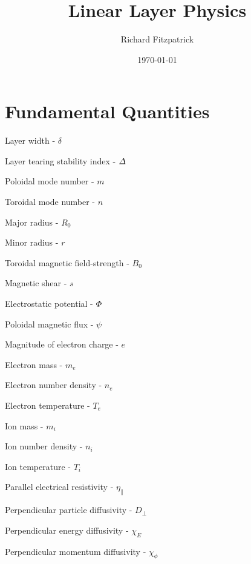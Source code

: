 \documentclass[notitlepage,12pt]{article}
\title{\bf Linear Layer Physics}
\date{\today}
\author{Richard Fitzpatrick}
\begin{document}
\maketitle

\section{Fundamental Quantities}
\begin{description}
\item Layer width - $\delta$
\item Layer tearing stability index - ${\mit\Delta}$
\item Poloidal mode number - $m$
\item Toroidal mode number - $n$
\item Major radius - $R_0$
\item Minor radius - $r$
\item Toroidal magnetic field-strength - $B_0$
\item Magnetic shear - $s$
\item Electrostatic potential - ${\mit\Phi}$
\item Poloidal magnetic flux - $\psi$
\item Magnitude of electron charge - $e$
\item Electron mass - $m_e$
\item Electron number density - $n_e$
\item Electron temperature - $T_e$
\item Ion mass - $m_i$
\item Ion number density - $n_i$
\item Ion temperature - $T_i$
\item Parallel electrical resistivity - $\eta_\parallel$ 
\item Perpendicular particle diffusivity - $D_\perp$
\item Perpendicular energy diffusivity - $\chi_E$
\item Perpendicular momentum diffusivity - $\chi_\phi$ 
\end{description}
\end{document}
